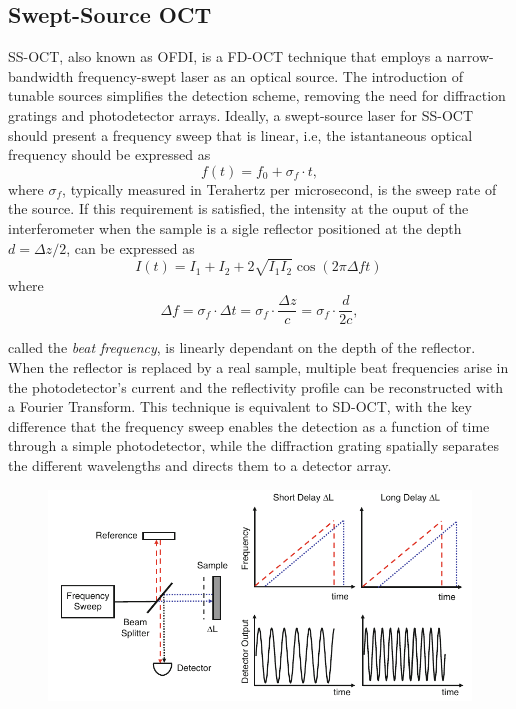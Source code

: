 \subsection{Swept-Source OCT}
\acf{SS-OCT}, also known as \ac{OFDI}, is a \ac{FD-OCT} technique that employs a narrow-bandwidth frequency-swept laser as an optical source. The introduction of tunable sources simplifies the detection scheme, removing the need for diffraction gratings and photodetector arrays. Ideally, a swept-source laser for \ac{SS-OCT} should present a frequency sweep that is linear, i.e, the istantaneous optical frequency should be expressed as
\begin{equation}\label{eq:frequency-sweep-linear}
	f(t) = f_0 + \sigma_f \cdot t,
\end{equation}
where $\sigma_f$, typically measured in Terahertz per microsecond, is the sweep rate of the source. If this requirement is satisfied, the intensity at the ouput of the interferometer when the sample is a sigle reflector positioned at the depth $d = \Delta z/2$, can be expressed as
\begin{equation}
	I(t) = I_1 + I_2 + 2\sqrt{I_1I_2}\cos\left( 2\pi \Delta f  t\right)\,
\end{equation}
where 
\begin{equation}
	\Delta f = \sigma_f \cdot \Delta t = \sigma_f \cdot \frac{\Delta z}{c} = \sigma_f \cdot \frac{d}{2c},
\end{equation}

 called the \emph{beat frequency}, is linearly dependant on the depth of the reflector. When the reflector is replaced by a real sample, multiple beat frequencies arise in the photodetector's current and the reflectivity profile can be reconstructed with a Fourier Transform. This technique is equivalent to \ac{SD-OCT}, with the key difference that the frequency sweep enables the detection as a function of time through a simple photodetector, while the diffraction grating spatially separates the different wavelengths and directs them to a detector array.


\begin{figure}[hbt]
	\myfloatalign
	\includegraphics[width=\linewidth]{gfx/ch2/ssoct}
	\caption{\cite{Drexler2015}}\label{fig:ssoct}
\end{figure}


